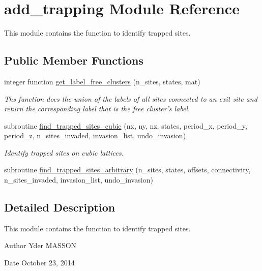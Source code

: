 \hypertarget{classadd__trapping}{
\section{add\-\_\-trapping \-Module \-Reference}
\label{classadd__trapping}
}


\-This module contains the function to identify trapped sites.  


\subsection*{\-Public \-Member \-Functions}
\begin{DoxyCompactItemize}
\item 
integer function \hyperlink{classadd__trapping_a3ecc26d4e45d30eb3f1ea423c2464d57}{get\-\_\-label\-\_\-free\-\_\-clusters} (n\-\_\-sites, states, mat)
\begin{DoxyCompactList}\small\item\em \-Ths function does the union of the labels of all sites connected to an exit site and return the corresponding label that is the free cluster's label. \end{DoxyCompactList}\item 
subroutine \hyperlink{classadd__trapping_a06df99a584626d4aac4d7b24332f62ba}{find\-\_\-trapped\-\_\-sites\-\_\-cubic} (nx, ny, nz, states, period\-\_\-x, period\-\_\-y, period\-\_\-z, n\-\_\-sites\-\_\-invaded, invasion\-\_\-list, undo\-\_\-invasion)
\begin{DoxyCompactList}\small\item\em \-Identify trapped sites on cubic lattices. \end{DoxyCompactList}\item 
subroutine \hyperlink{classadd__trapping_aa2943f8f85fd470d63603612b3624573}{find\-\_\-trapped\-\_\-sites\-\_\-arbitrary} (n\-\_\-sites, states, offsets, connectivity, n\-\_\-sites\-\_\-invaded, invasion\-\_\-list, undo\-\_\-invasion)
\end{DoxyCompactItemize}


\subsection{\-Detailed \-Description}
\-This module contains the function to identify trapped sites. 

\begin{DoxyAuthor}{\-Author}
\-Yder \-M\-A\-S\-S\-O\-N 
\end{DoxyAuthor}
\begin{DoxyDate}{\-Date}
\-October 23, 2014 
\end{DoxyDate}


